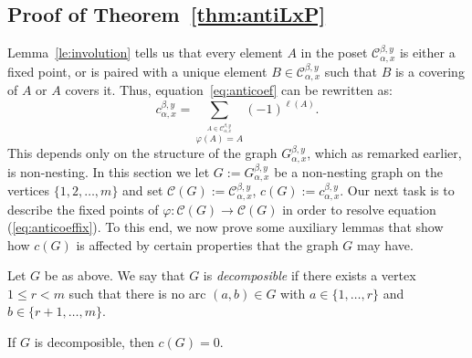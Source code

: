 \documentclass[ALCO,ThmDefs,Unicode,epreuves]{cedram}
\begin{document}
\subsection{Proof of Theorem~\ref{thm:antiLxP}}\label{ss:proof1} Lemma~\ref{le:involution} tells us that every element $A$ in the poset $\mathcal{C}_{\alpha,x}^{\beta,y}$ is either a fixed point, or is paired with a unique element $B\in\mathcal{C}_{\alpha,x}^{\beta,y}$ such that $B$ is a covering of $A$ or $A$ covers it. Thus, equation~\eqref{eq:anticoef} can be rewritten as:
\begin{equation}\label{eq:anticoeffix}
 c_{\alpha,x}^{\beta,y}=\sum_{\stackrel{A\in \mathcal{C}_{\alpha,x}^{\beta,y}} %
 {\varphi(A)=A}} (-1)^{\ell(A)}.
\end{equation}
This depends only on the structure of the graph $G_{\alpha,x}^{\beta,y}$, which as remarked earlier, is non-nesting. In this section we let $G:=G_{\alpha,x}^{\beta,y}$ be a non-nesting graph on the vertices $\{1,2,\ldots, m\}$ and set $\mathcal{C}(G):= \mathcal{C}_{\alpha,x}^{\beta,y}$, $c(G) := c_{\alpha,x}^{\beta,y}$. Our next task is to describe the fixed points of $\varphi\colon \mathcal{C}(G)\to \mathcal{C}(G)$ in order to resolve equation (\ref{eq:anticoeffix}). To this end, we now prove some auxiliary lemmas that show how $c(G)$ is affected by certain properties that the graph $G$ may have.

\begin{defi}\label{def:decomposible}
Let $G$ be as above. We say that $G$ is \emph{decomposible} if there exists a vertex $1\leq r<m$ such that there is no arc $(a,b)\in G$ with $a\in\{1,\dots ,r\}$ and $b\in\{r+1,\dots,m\}$.

\end{defi}

\begin{lemma}\label{le:decomposible}
 If $G$ is decomposible, then $c(G)=0$.
\end{lemma}
\end{document}
